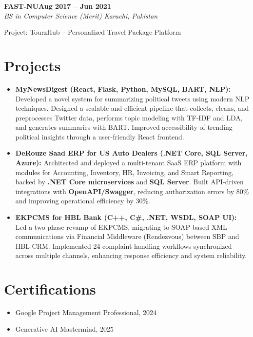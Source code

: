 \documentclass[letterpaper,10pt]{article}
\newcommand{\headingBf}[2]{
  \hspace{10pt}\textbf{#1}\hfill\textbf{#2}\\
}
\newcommand{\headingIt}[2]{
  \hspace{10pt}\textit{#1}\hfill\textit{#2}\\
}
\newenvironment{resume_list}{
  \vspace{-7pt}
  \begin{itemize}[itemsep=-2px, parsep=1pt, leftmargin=30pt]
}{
  \end{itemize}
}
\begin{document}
\headingBf{FAST-NU}{Aug 2017 -- Jun 2021}
\headingIt{BS in Computer Science (Merit) \hfill Karachi, Pakistan}{}
\begin{resume_list}
    \item Project: TourzHub -- Personalized Travel Package Platform
\end{resume_list}

\section{Projects}
\begin{itemize}
    \setlength\itemsep{3pt}
    \item \textbf{MyNewsDigest (React, Flask, Python, MySQL, BART, NLP):} Developed a novel system for summarizing political tweets using modern NLP techniques. Designed a scalable and efficient pipeline that collects, cleans, and preprocesses Twitter data, performs topic modeling with TF-IDF and LDA, and generates summaries with BART. Improved accessibility of trending political insights through a user-friendly React frontend.
    \item \textbf{DeRouze Saad ERP for US Auto Dealers (.NET Core, SQL Server, Azure): } Architected and deployed a multi-tenant SaaS ERP platform with modules for Accounting, Inventory, HR, Invoicing, and Smart Reporting, backed by \textbf{.NET Core microservices} and \textbf{SQL Server}. Built API-driven integrations with \textbf{OpenAPI/Swagger}, reducing authorization errors by 80\% and improving operational efficiency by 30\%.
    \item \textbf{EKPCMS for HBL Bank (C++, C\#, .NET, WSDL, SOAP UI):} Led a two-phase revamp of EKPCMS, migrating to SOAP-based XML communications via Financial Middleware (Rendezvous) between SBP and HBL CRM. Implemented 24 complaint handling workflows synchronized across multiple channels, enhancing response efficiency and system reliability.
\end{itemize}

\section{Certifications}
\begin{itemize}
    \item Google Project Management Professional, 2024
    \item Generative AI Mastermind, 2025
\end{itemize}

\vspace*{\fill}
\end{document}

